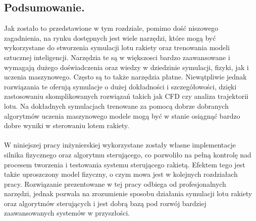 \subsection{Podsumowanie.}
Jak zostało to przedstawione w tym rozdziale, pomimo dość niszowego
zagadnienia, na rynku dostępnych jest wiele
narzędzi,
które
mogą być
wykorzystane do stworzenia symulacji lotu rakiety oraz trenowania modeli
sztucznej inteligencji. Narzędzia te są w większosci bardzo zaawansowane i
wymagają dużego doświadczenia oraz wiedzy w dziedzinie symulacji, fizyki, jak
i uczenia maszynowego. Często są to także narzędzia płatne. Niewątpliwie
jednak rozwiązania te oferują symulacje o dużej dokładności i
szczegółowości, dzięki zastosowaniu skomplikowanych rozwiązań takich jak CFD
czy analiza trajektorii lotu. Na dokładnych symulacjach trenowane za pomocą
dobrze dobranych algorytmów uczenia maszynowego modele mogą być w stanie
osiągnąć bardzo dobre wyniki w sterowaniu lotem rakiety.\\
\\ W niniejszej pracy inżynierskiej
wykorzystane
zostały własne implementacje silnika fizycznego oraz algorytmu sterującego,
co pozwoliło na pełną kontrolę nad procesem tworzenia i testowania systemu
sterującego rakietą. Efektem tego jest także uproszczony model fizyczny, o
czym mowa jest w kolejnych rozdziałach pracy. Rozwiązanie prezentowane w tej
pracy odbiega od profesjonalnych narzędzi, jednak pozwala na zrozumienie
sposobu działania symulacji lotu rakiety oraz algorytmów sterujących i jest
dobrą bazą pod rozwój bardziej zaawansowanych systemów w przyszłości.
